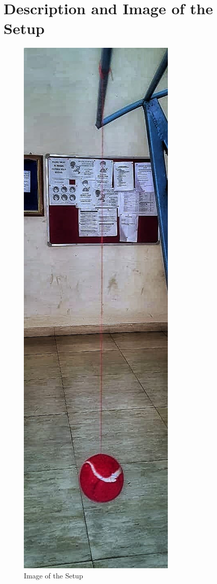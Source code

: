 \documentclass[12pt]{article}
\begin{document}
	\section{Description and Image of the Setup}
	\begin{figure}[H]
		\centering
		\includegraphics[scale=0.25]{Experiment}
		\caption{Image of the Setup}
	\end{figure}
\end{document}
